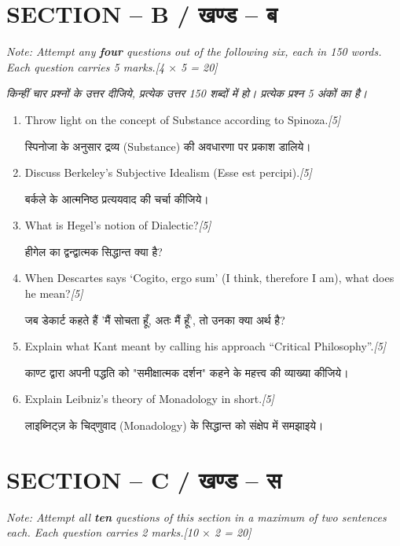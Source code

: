 \documentclass[11pt,a4paper]{article}
\newcommand{\pts}[1]{\hfill \textit{[#1]}}
\begin{document}
\bigskip

\section*{SECTION -- B / खण्ड -- ब}
\noindent \textit{Note: Attempt any \textbf{four} questions out of the following six, each in 150 words. Each question carries 5 marks.}\pts{4 $\times$ 5 = 20}

\noindent \textit{किन्हीं चार प्रश्नों के उत्तर दीजिये, प्रत्येक उत्तर 150 शब्दों में हो। प्रत्येक प्रश्न 5 अंकों का है।}

\begin{enumerate}[label=\textbf{\arabic*.},leftmargin=*,start=6,itemsep=10pt]

  \item Throw light on the concept of Substance according to Spinoza.\pts{5}
  
  स्पिनोजा के अनुसार द्रव्य (Substance) की अवधारणा पर प्रकाश डालिये।

  \item Discuss Berkeley's Subjective Idealism (Esse est percipi).\pts{5}
  
  बर्कले के आत्मनिष्ठ प्रत्ययवाद की चर्चा कीजिये।

  \item What is Hegel's notion of Dialectic?\pts{5}
  
  हीगेल का द्वन्द्वात्मक सिद्धान्त क्या है?

  \item When Descartes says `Cogito, ergo sum' (I think, therefore I am), what does he mean?\pts{5}
  
  जब डेकार्ट कहते हैं 'मैं सोचता हूँ, अतः मैं हूँ', तो उनका क्या अर्थ है?

  \item Explain what Kant meant by calling his approach ``Critical Philosophy''.\pts{5}
  
  काण्ट द्वारा अपनी पद्धति को "समीक्षात्मक दर्शन" कहने के महत्त्व की व्याख्या कीजिये।

  \item Explain Leibniz's theory of Monadology in short.\pts{5}
  
  लाइब्निट्ज़ के चिद्णुवाद (Monadology) के सिद्धान्त को संक्षेप में समझाइये।

\end{enumerate}

\bigskip

\section*{SECTION -- C / खण्ड -- स}
\noindent \textit{Note: Attempt all \textbf{ten} questions of this section in a maximum of two sentences each. Each question carries 2 marks.}\pts{10 $\times$ 2 = 20}
\end{document}
